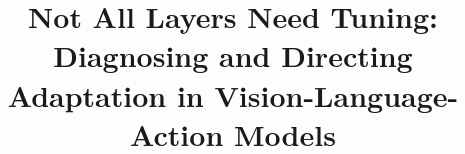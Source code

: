 \documentclass[letterpaper, 10 pt, conference]{ieeeconf}  %
\title{\LARGE \bf
Not All Layers Need Tuning: Diagnosing and Directing Adaptation in Vision-Language-Action Models
}
\begin{document}
\maketitle
\thispagestyle{empty}
\pagestyle{empty}

\begin{abstract}%

\end{abstract}











\end{document}
